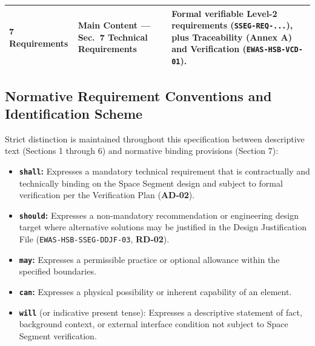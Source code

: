 \begin{table}[H]
{\begin{tabularx}{\textwidth}{|>{\raggedright\arraybackslash}p{3.5cm}|>{\raggedright\arraybackslash}p{4.2cm}|>{\raggedright\arraybackslash}X|}
    \textbf{7} \newline Requirements & \textbf{Main Content --- Sec.\ 7} \newline Technical Requirements & Formal verifiable Level-2 requirements (\texttt{SSEG-REQ-...}), plus Traceability (\textbf{Annex A}) and Verification (\texttt{EWAS-HSB-VCD-01}). \\ \hline
\end{tabularx}}
\end{table}

\subsection{Normative Requirement Conventions and Identification Scheme}

Strict distinction is maintained throughout this specification between descriptive text (Sections 1 through 6) and normative binding provisions (Section 7):
\begin{itemize}
    \item \textbf{\texttt{shall}:} Expresses a mandatory technical requirement that is contractually and technically binding on the Space Segment design and subject to formal verification per the Verification Plan (\textbf{AD-02}).
    \item \textbf{\texttt{should}:} Expresses a non-mandatory recommendation or engineering design target where alternative solutions may be justified in the Design Justification File (\texttt{EWAS-HSB-SSEG-DDJF-03}, \textbf{RD-02}).
    \item \textbf{\texttt{may}:} Expresses a permissible practice or optional allowance within the specified boundaries.
    \item \textbf{\texttt{can}:} Expresses a physical possibility or inherent capability of an element.
    \item \textbf{\texttt{will}} (or indicative present tense): Expresses a descriptive statement of fact, background context, or external interface condition not subject to Space Segment verification.
\end{itemize}

